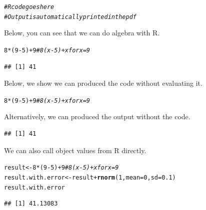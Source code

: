 \documentclass{article}\usepackage[]{graphicx}\usepackage[]{xcolor}
\makeatletter
\newcommand{\hlnum}[1]{\textcolor[rgb]{0.686,0.059,0.569}{#1}}%
\newcommand{\hlcom}[1]{\textcolor[rgb]{0.678,0.584,0.686}{\textit{#1}}}%
\newcommand{\hlopt}[1]{\textcolor[rgb]{0,0,0}{#1}}%
\newcommand{\hldef}[1]{\textcolor[rgb]{0.345,0.345,0.345}{#1}}%
\newcommand{\hlkwb}[1]{\textcolor[rgb]{0.69,0.353,0.396}{#1}}%
\newcommand{\hlkwc}[1]{\textcolor[rgb]{0.333,0.667,0.333}{#1}}%
\newcommand{\hlkwd}[1]{\textcolor[rgb]{0.737,0.353,0.396}{\textbf{#1}}}%
\newenvironment{kframe}{%
 \def\at@end@of@kframe{}%
 \ifinner\ifhmode%
  \def\at@end@of@kframe{\end{minipage}}%
  \begin{minipage}{\columnwidth}%
 \fi\fi%
 \def\FrameCommand##1{\hskip\@totalleftmargin \hskip-\fboxsep
 \colorbox{shadecolor}{##1}\hskip-\fboxsep
     \hskip-\linewidth \hskip-\@totalleftmargin \hskip\columnwidth}%
 \MakeFramed {\advance\hsize-\width
   \@totalleftmargin\z@ \linewidth\hsize
   \@setminipage}}%
 {\par\unskip\endMakeFramed%
 \at@end@of@kframe}
\newenvironment{knitrout}{}{} %
\makeatother
\begin{document}
\begin{multicols}{2}
\begin{knitrout}\scriptsize
{}\color{fgcolor}\begin{kframe}
\begin{alltt}
\hlcom{# R code goes here}
\hlcom{# Output is automatically printed in the pdf}
\end{alltt}
\end{kframe}
\end{knitrout}
Below, you can see that we can do algebra with R.
\begin{knitrout}\scriptsize
{}\color{fgcolor}\begin{kframe}
\begin{alltt}
\hlnum{8}\hlopt{*}\hldef{(}\hlnum{9}\hlopt{-}\hlnum{5}\hldef{)} \hlopt{+} \hlnum{9}   \hlcom{# 8(x-5) + x for x=9}
\end{alltt}
\begin{verbatim}
## [1] 41
\end{verbatim}
\end{kframe}
\end{knitrout}
Below, we show we can produced the code without evaluating it.
\begin{knitrout}\scriptsize
{}\color{fgcolor}\begin{kframe}
\begin{alltt}
\hlnum{8}\hlopt{*}\hldef{(}\hlnum{9}\hlopt{-}\hlnum{5}\hldef{)} \hlopt{+} \hlnum{9}   \hlcom{# 8(x-5) + x for x=9}
\end{alltt}
\end{kframe}
\end{knitrout}
Alternatively, we can produced the output without the code.
\begin{knitrout}\scriptsize
{}\color{fgcolor}\begin{kframe}
\begin{verbatim}
## [1] 41
\end{verbatim}
\end{kframe}
\end{knitrout}

We can also call object values from R directly.
\begin{knitrout}\scriptsize
{}\color{fgcolor}\begin{kframe}
\begin{alltt}
\hldef{result} \hlkwb{<-}  \hlnum{8}\hlopt{*}\hldef{(}\hlnum{9}\hlopt{-}\hlnum{5}\hldef{)} \hlopt{+} \hlnum{9}   \hlcom{# 8(x-5) + x for x = 9}
\hldef{result.with.error} \hlkwb{<-} \hldef{result} \hlopt{+} \hlkwd{rnorm}\hldef{(}\hlnum{1}\hldef{,} \hlkwc{mean} \hldef{=} \hlnum{0}\hldef{,} \hlkwc{sd} \hldef{=} \hlnum{0.1}\hldef{)}
\hldef{result.with.error}
\end{alltt}
\begin{verbatim}
## [1] 41.13083
\end{verbatim}
\end{kframe}
\end{knitrout}


\end{multicols}
\end{document}
